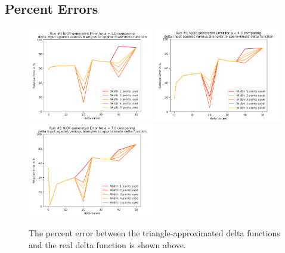 \documentclass[a4paper]{article}
\begin{document}
\subsection{Percent Errors}
\begin{figure}[H]
\centering
\includegraphics[width=0.49\textwidth]{run1_error_alpha_equals_1.png}
\includegraphics[width=0.49\textwidth]{run1_error_alpha_equals_4.png}
\includegraphics[width=0.49\textwidth]{run1_error_alpha_equals_7.png}
\caption{\label{fig:run1_error}The percent error between the triangle-approximated delta functions and the real delta function is shown above. }
\end{figure}
\end{document}

